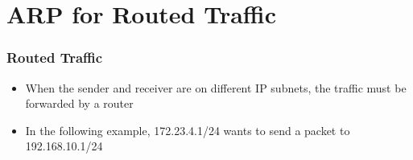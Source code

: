 \documentclass[pdflatex,compress,mathserif]{beamer}
\begin{document}
\section{ARP for Routed Traffic}

\begin{frame}
	\frametitle{Routed Traffic}
	\begin{itemize}
		\item When the sender and receiver are on different IP subnets, the traffic must be forwarded by a router
		\item In the following example, 172.23.4.1/24 wants to send a packet to 192.168.10.1/24
	\end{itemize}
\end{frame}
\end{document}
